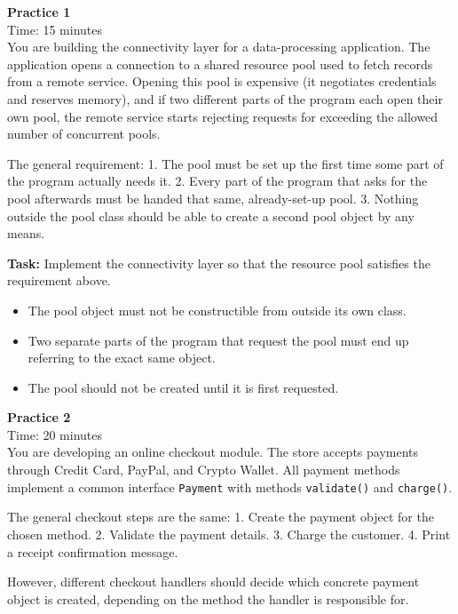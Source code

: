 \documentclass[11pt]{article}
\newcommand{\qheader}[2]{%
    \noindent\textbf{#1}\\[2pt]
    \noindent Time: #2\\[10pt]
}
\begin{document}
\qheader{Practice 1}{15 minutes}
\noindent
You are building the connectivity layer for a data-processing application. The application opens a connection to a shared resource pool used to fetch records from a remote service. Opening this pool is expensive (it negotiates credentials and reserves memory), and if two different parts of the program each open their own pool, the remote service starts rejecting requests for exceeding the allowed number of concurrent pools.

\vspace{6pt}
\noindent
The general requirement: 1. The pool must be set up the first time some part of the program actually needs it. 2. Every part of the program that asks for the pool afterwards must be handed that same, already-set-up pool. 3. Nothing outside the pool class should be able to create a second pool object by any means.

\vspace{6pt}
\noindent
\textbf{Task:} Implement the connectivity layer so that the resource pool satisfies the requirement above.
\begin{itemize}[nosep]
    \item The pool object must not be constructible from outside its own class.
    \item Two separate parts of the program that request the pool must end up referring to the exact same object.
    \item The pool should not be created until it is first requested.
\end{itemize}

\newpage

\qheader{Practice 2}{20 minutes}
\noindent
You are developing an online checkout module. The store accepts payments through Credit Card, PayPal, and Crypto Wallet. All payment methods implement a common interface \texttt{Payment} with methods \texttt{validate()} and \texttt{charge()}.

\vspace{6pt}
\noindent
The general checkout steps are the same: 1. Create the payment object for the chosen method. 2. Validate the payment details. 3. Charge the customer. 4. Print a receipt confirmation message.

\vspace{6pt}
\noindent
However, different checkout handlers should decide which concrete payment object is created, depending on the method the handler is responsible for.
\end{document}
